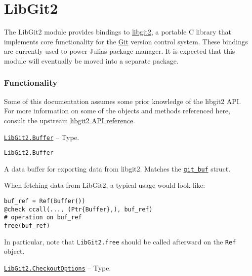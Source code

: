 \hypertarget{14272245692301851811}{}


\chapter{LibGit2}



The LibGit2 module provides bindings to \href{https://libgit2.org/}{libgit2}, a portable C library that implements core functionality for the \href{https://git-scm.com/}{Git} version control system. These bindings are currently used to power Julia{\textquotesingle}s package manager. It is expected that this module will eventually be moved into a separate package.



\hypertarget{13716495418266911399}{}


\subsection{Functionality}



Some of this documentation assumes some prior knowledge of the libgit2 API. For more information on some of the objects and methods referenced here, consult the upstream \href{https://libgit2.org/libgit2/\#v0.25.1}{libgit2 API reference}.


\hypertarget{6862256905288214016}{} 
\hyperlink{6862256905288214016}{\texttt{LibGit2.Buffer}}  -- {Type.}

\begin{adjustwidth}{2em}{0pt}


\begin{verbatim}
LibGit2.Buffer
\end{verbatim}

A data buffer for exporting data from libgit2. Matches the \href{https://libgit2.org/libgit2/\#HEAD/type/git\_buf}{\texttt{git\_buf}} struct.

When fetching data from LibGit2, a typical usage would look like:


\begin{verbatim}
buf_ref = Ref(Buffer())
@check ccall(..., (Ptr{Buffer},), buf_ref)
# operation on buf_ref
free(buf_ref)
\end{verbatim}

In particular, note that \texttt{LibGit2.free} should be called afterward on the \texttt{Ref} object.



\end{adjustwidth}
\hypertarget{16441061243067746546}{} 
\hyperlink{16441061243067746546}{\texttt{LibGit2.CheckoutOptions}}  -- {Type.}

